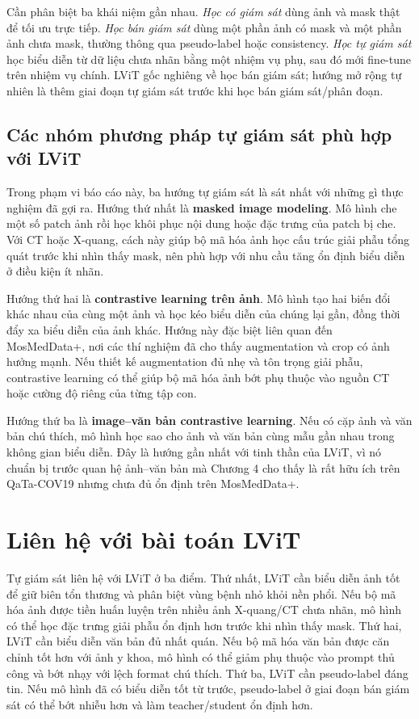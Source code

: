 Cần phân biệt ba khái niệm gần nhau. \textit{Học có giám sát} dùng ảnh và mask thật để tối ưu trực tiếp. \textit{Học bán giám sát} dùng một phần ảnh có mask và một phần ảnh chưa mask, thường thông qua pseudo-label hoặc consistency. \textit{Học tự giám sát} học biểu diễn từ dữ liệu chưa nhãn bằng một nhiệm vụ phụ, sau đó mới fine-tune trên nhiệm vụ chính. LViT gốc nghiêng về học bán giám sát; hướng mở rộng tự nhiên là thêm giai đoạn tự giám sát trước khi học bán giám sát/phân đoạn.

\subsection{Các nhóm phương pháp tự giám sát phù hợp với LViT}

Trong phạm vi báo cáo này, ba hướng tự giám sát là sát nhất với những gì thực nghiệm đã gợi ra. Hướng thứ nhất là \textbf{masked image modeling}. Mô hình che một số patch ảnh rồi học khôi phục nội dung hoặc đặc trưng của patch bị che. Với CT hoặc X-quang, cách này giúp bộ mã hóa ảnh học cấu trúc giải phẫu tổng quát trước khi nhìn thấy mask, nên phù hợp với nhu cầu tăng ổn định biểu diễn ở điều kiện ít nhãn.

Hướng thứ hai là \textbf{contrastive learning trên ảnh}. Mô hình tạo hai biến đổi khác nhau của cùng một ảnh và học kéo biểu diễn của chúng lại gần, đồng thời đẩy xa biểu diễn của ảnh khác. Hướng này đặc biệt liên quan đến MosMedData+, nơi các thí nghiệm đã cho thấy augmentation và crop có ảnh hưởng mạnh. Nếu thiết kế augmentation đủ nhẹ và tôn trọng giải phẫu, contrastive learning có thể giúp bộ mã hóa ảnh bớt phụ thuộc vào nguồn CT hoặc cường độ riêng của từng tập con.

Hướng thứ ba là \textbf{image--văn bản contrastive learning}. Nếu có cặp ảnh và văn bản chú thích, mô hình học sao cho ảnh và văn bản cùng mẫu gần nhau trong không gian biểu diễn. Đây là hướng gần nhất với tinh thần của LViT, vì nó chuẩn bị trước quan hệ ảnh--văn bản mà Chương 4 cho thấy là rất hữu ích trên QaTa-COV19 nhưng chưa đủ ổn định trên MosMedData+.

\section{Liên hệ với bài toán LViT}

Tự giám sát liên hệ với LViT ở ba điểm. Thứ nhất, LViT cần biểu diễn ảnh tốt để giữ biên tổn thương và phân biệt vùng bệnh nhỏ khỏi nền phổi. Nếu bộ mã hóa ảnh được tiền huấn luyện trên nhiều ảnh X-quang/CT chưa nhãn, mô hình có thể học đặc trưng giải phẫu ổn định hơn trước khi nhìn thấy mask. Thứ hai, LViT cần biểu diễn văn bản đủ nhất quán. Nếu bộ mã hóa văn bản được căn chỉnh tốt hơn với ảnh y khoa, mô hình có thể giảm phụ thuộc vào prompt thủ công và bớt nhạy với lệch format chú thích. Thứ ba, LViT cần pseudo-label đáng tin. Nếu mô hình đã có biểu diễn tốt từ trước, pseudo-label ở giai đoạn bán giám sát có thể bớt nhiễu hơn và làm teacher/student ổn định hơn.

